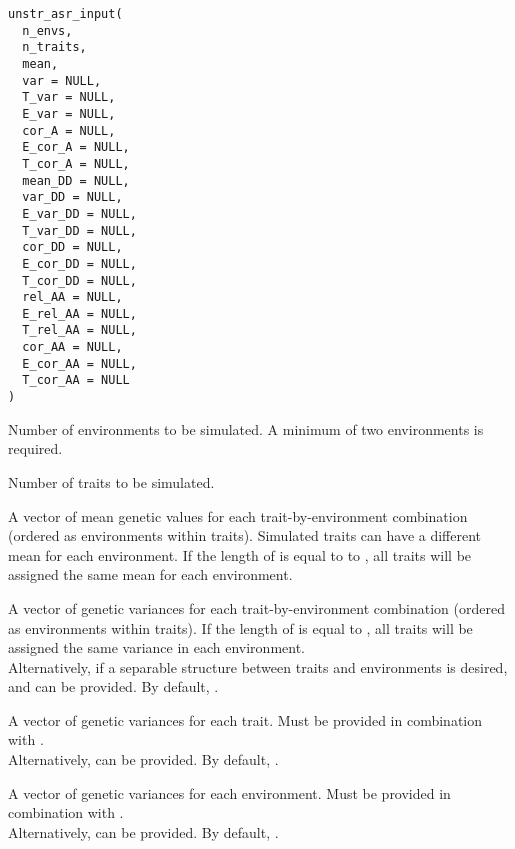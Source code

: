 \documentclass[a4paper]{book}
\begin{document}
%
\begin{Usage}
\begin{verbatim}
unstr_asr_input(
  n_envs,
  n_traits,
  mean,
  var = NULL,
  T_var = NULL,
  E_var = NULL,
  cor_A = NULL,
  E_cor_A = NULL,
  T_cor_A = NULL,
  mean_DD = NULL,
  var_DD = NULL,
  E_var_DD = NULL,
  T_var_DD = NULL,
  cor_DD = NULL,
  E_cor_DD = NULL,
  T_cor_DD = NULL,
  rel_AA = NULL,
  E_rel_AA = NULL,
  T_rel_AA = NULL,
  cor_AA = NULL,
  E_cor_AA = NULL,
  T_cor_AA = NULL
)
\end{verbatim}
\end{Usage}
%
\begin{Arguments}
\begin{ldescription}
\item[\code{n\_envs}] Number of environments to be simulated. A minimum of two environments is required.

\item[\code{n\_traits}] Number of traits to be simulated.

\item[\code{mean}] A vector of mean genetic values for each trait-by-environment combination (ordered
as environments within traits). Simulated traits can have a different mean for each
environment. If the length of  is equal to to , all traits will be
assigned the same mean for each environment.

\item[\code{var}] A vector of genetic variances for each trait-by-environment combination (ordered as
environments within traits). If the length of  is equal to , all
traits will be assigned the same variance in each environment. \\{}
Alternatively, if a separable structure between traits and environments is desired,
 and  can be provided. By default, .

\item[\code{T\_var}] A vector of genetic variances for each trait. Must be provided in combination with
. \\{}
Alternatively,  can be provided. By default, .

\item[\code{E\_var}] A vector of genetic variances for each environment. Must be provided in
combination with . \\{}
Alternatively,  can be provided. By default, .


\end{ldescription}
\end{Arguments}
\end{document}
